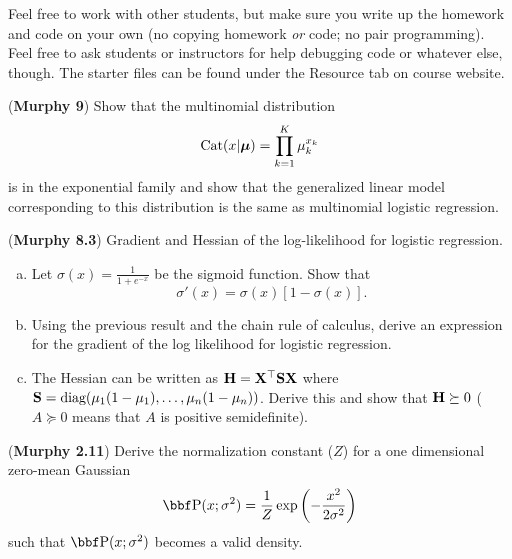 \documentclass[12pt,letterpaper]{hmcpset}
\begin{document}
Feel free to work with other students, but make sure you write up the homework
and code on your own (no copying homework \textit{or} code; no pair programming).
Feel free to ask students or instructors for help debugging code or whatever else,
though.
The starter files can be found under the Resource tab on course website.\\


\begin{problem}[1]
	(\textbf{Murphy 9}) Show that the multinomial distribution
	\[
	\text{Cat}(x|\hbox{\boldmath$\mu$}) = \prod_{k=1}^K \mu_k^{x_k}
	\]
	is in the exponential family and show that the generalized linear model
	corresponding to this distribution is the same as multinomial logistic
	regression.
\end{problem}
\begin{solution}
	\vfill
\end{solution}
\newpage

\begin{problem}[2]
	(\textbf{Murphy 8.3}) Gradient and Hessian of the log-likelihood for
	logistic regression.
	\begin{enumerate}[(a)]
		\item Let $\sigma(x) = \frac{1}{1 + e^{-x}}$ be the sigmoid function. Show that
		\[
		\sigma'(x) = \sigma(x)\left[1 - \sigma(x)\right].
		\]
		\item Using the previous result and the chain rule of calculus, derive an
		expression for the gradient of the log likelihood for logistic regression.
		\item The Hessian can be written as ${\bf H}={\bf X}^\top{\bf S}{\bf X}$ where ${\bf S} =
		{\hbox{diag}}(\mu_1(1-\mu_1), \dots, \mu_n(1-\mu_n))$. Derive this and show that
		${\bf H} \succeq 0$ ($A \succeq 0$ means that $A$ is positive semidefinite).
	\end{enumerate}
\end{problem}
\begin{solution}
	\vfill
\end{solution}
\newpage

\begin{problem}[3]
	(\textbf{Murphy 2.11})
	Derive the normalization constant ($Z$) for a one dimensional
	zero-mean Gaussian
	\[
	\PP(x; \sigma^2) = \frac{1}{Z}\exp\left(-\frac{x^2}{2\sigma^2}\right)
	\]
	such that $\PP(x; \sigma^2)$ becomes a valid density.
\end{problem}
\begin{solution}
	\vfill
\end{solution}
\newpage
\end{document}
